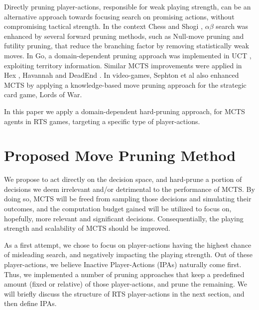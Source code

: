 \documentclass[conference]{IEEEtran}
\begin{document}
Directly pruning player-actions, responsible for weak playing strength, can be an alternative approach towards focusing search on promising actions, without compromising tactical strength. In the context Chess \cite{heinz_adaptive_1999} and Shogi \cite{hoki_efficiency_2012}, $\alpha\beta$ search was enhanced by several forward pruning methods, such as Null-move pruning and futility pruning, that reduce the branching factor by removing statistically weak moves. In Go, a domain-dependent pruning approach was implemented in UCT \cite{huang_pruning_2010-1}, exploiting territory information. Similar MCTS improvements were applied in Hex \cite{arneson_monte_2010-1}, Havannah \cite{dugueperoux_pruning_2016} and DeadEnd \cite{he_game_2008-1}. In video-games, Sephton et al \cite{sephton_heuristic_2014} also enhanced MCTS by applying a knowledge-based move pruning approach for the strategic card game, Lords of War.

In this paper we apply a domain-dependent hard-pruning approach, for MCTS agents in RTS games, targeting a specific type of player-actions.



\section{Proposed Move Pruning Method}
\label{sec:proposed_method}

We propose to act directly on the decision space, and hard-prune a portion of decisions we deem irrelevant and/or detrimental to the performance of MCTS. By doing so, MCTS will be freed from sampling those decisions and simulating their outcomes, and the computation budget gained will be utilized to focus on, hopefully, more relevant and significant decisions. Consequentially, the playing strength and scalability of MCTS should be improved.

As a first attempt, we chose to focus on player-actions having the highest chance of misleading search, and negatively impacting the playing strength. Out of these player-actions, we believe Inactive Player-Actions (IPAs) naturally come first. Thus, we implemented a number of pruning approaches that keep a predefined amount (fixed or relative) of those player-actions, and prune the remaining. We will briefly discuss the structure of RTS player-actions in the next section, and then define IPAs.

\end{document}
